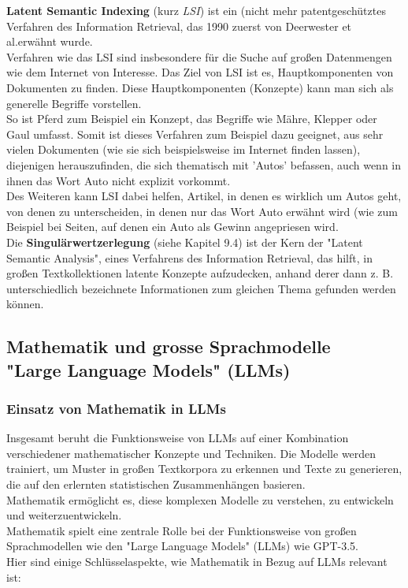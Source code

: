 \documentclass[12pt]{article}
\begin{document}
\textbf{Latent Semantic Indexing} (kurz \textit{LSI}) ist ein (nicht mehr patentgeschütztes Verfahren des Information Retrieval, das 1990 zuerst von Deerwester et al.erwähnt wurde.\\[0.2cm]
Verfahren wie das LSI sind insbesondere für die Suche auf großen Datenmengen wie dem Internet von Interesse. Das Ziel von LSI ist es, Hauptkomponenten von Dokumenten zu finden. Diese Hauptkomponenten (Konzepte) kann man sich als generelle Begriffe vorstellen.\\
So ist Pferd zum Beispiel ein Konzept, das Begriffe wie Mähre, Klepper oder Gaul umfasst. Somit ist dieses Verfahren zum Beispiel dazu geeignet, aus sehr vielen Dokumenten (wie sie sich beispielsweise im Internet finden lassen), diejenigen herauszufinden, die sich thematisch mit 'Autos' befassen, auch wenn in ihnen das Wort Auto nicht explizit vorkommt.\\
 Des Weiteren kann LSI dabei helfen, Artikel, in denen es wirklich um Autos geht, von denen zu unterscheiden, in denen nur das Wort Auto erwähnt wird (wie zum Beispiel bei Seiten, auf denen ein Auto als Gewinn angepriesen wird.\\
Die \textbf{Singulärwertzerlegung} (siehe Kapitel 9.4) ist der Kern der "Latent Semantic Analysis", eines Verfahrens des Information Retrieval, das hilft, in großen Textkollektionen latente Konzepte aufzudecken, anhand derer dann z. B. unterschiedlich bezeichnete Informationen zum gleichen Thema gefunden werden können.\\


\subsection{Mathematik und grosse Sprachmodelle \\ "Large Language Models" (LLMs)}

\subsubsection{Einsatz von Mathematik in LLMs}

Insgesamt beruht die Funktionsweise von LLMs auf einer Kombination verschiedener mathematischer Konzepte und Techniken. Die Modelle werden trainiert, um Muster in großen Textkorpora zu erkennen und Texte zu generieren, die auf den erlernten statistischen Zusammenhängen basieren. \\ Mathematik ermöglicht es, diese komplexen Modelle zu verstehen, zu entwickeln und weiterzuentwickeln. \\
Mathematik spielt eine zentrale Rolle bei der Funktionsweise von großen Sprachmodellen wie den "Large Language Models" (LLMs) wie GPT-3.5. \\
Hier sind einige Schlüsselaspekte, wie Mathematik in Bezug auf LLMs relevant ist:\\
\end{document}
